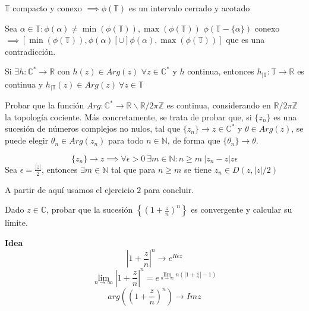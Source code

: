 \begin{sol}
	$\mathbb{T}$ compacto y conexo $\implies \phi(\mathbb{T})$ es un intervalo cerrado y acotado
	
	Sea $\alpha\in\mathbb{T} : \phi(\alpha) \not =\min(\phi(\mathbb{T})), \max(\phi(\mathbb{T}))$ 
	$\phi ( \mathbb{T}-\{ \alpha \} )$ conexo $\implies [ \min(\phi(\mathbb{T})), \phi(\alpha)[ \cup ]\phi(\alpha), \max( \phi(\mathbb{T}) ) ] $ que es una contradicción.
	
	Si $\exists h:\mathbb{C}^{\ast} \rightarrow \mathbb{R}$ con $h(z)\in Arg(z)$ $\forall z\in\mathbb{C}^{\ast}$ y $h$ continua, entonces
	$h_{| \mathbb{T}} : \mathbb{T} \rightarrow \mathbb{R}$ es continua y $h_{|\mathbb{T}} (z) \in Arg(z) \ \forall z\in\mathbb{T}$
\end{sol}

\begin{ejer}
	Probar que la función $Arg : \mathbb{C}^{\ast} \rightarrow \mathbb{R}\backslash \mathbb{R}/2\pi\mathbb{Z}$ es continua, considerando en $\mathbb{R}/2\pi\mathbb{Z}$ la topología cociente. Más concretamente, se trata de probar que, si $\{z_n\}$ es una sucesión de números complejos no nulos, tal que $\{z_n\} \rightarrow z\in\mathbb{C}^{\ast}$ y $\theta\in Arg(z)$, se puede elegir $\theta_n\in Arg(z_n)$ para todo $n\in\mathbb{N}$, de forma que $\{ \theta_n \} \rightarrow \theta$.
\end{ejer}




\begin{sol}
	
	
	$$
	\{ z_n \} \rightarrow z \implies \forall \epsilon>0\ \exists m\in\mathbb{N} : n\geq m \ |z_n-z|z\epsilon
	$$
	Sea $\epsilon = \frac{|z|}{2}$, entonces 
	$\exists m\in\mathbb{N}$ tal que para $n\geq m$ se tiene $z_n\in D(z, |z|/2)$
	
	A partir de aquí usamos el ejercicio $2$ para concluir.
\end{sol}



\begin{ejer}
	Dado $z\in\mathbb{C}$, probar que la sucesión $\left\{ \left( 1+\frac{z}{n} \right)^n \right\}$ es convergente y calcular su límite.
\end{ejer}


\textbf{Idea}
$$
\left|1+\frac{z}{n}\right|^n \rightarrow e^{Re z}
$$
$$
\lim_{n\rightarrow\infty} \left|1+\frac{z}{n}\right|^n 
= e^{ \lim_{n\rightarrow\infty} n\left(\left|1+\frac{z}{n}\right|-1\right) }
$$
$$
arg\left(\left(1+\frac{z}{n}\right)^n\right) \rightarrow Im z
$$

